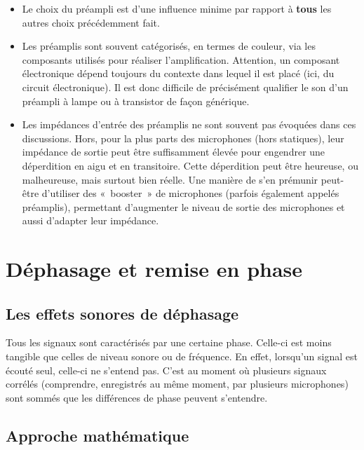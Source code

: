 \documentclass[
]{book}
\providecommand{\tightlist}{%
  \setlength{\itemsep}{0pt}\setlength{\parskip}{0pt}}
\begin{document}
\begin{itemize}
\tightlist
\item
  Le choix du préampli est d'une influence minime par rapport à \textbf{tous} les autres choix précédemment fait.
\item
  Les préamplis sont souvent catégorisés, en termes de couleur, via les composants utilisés pour réaliser l'amplification. Attention, un composant électronique dépend toujours du contexte dans lequel il est placé (ici, du circuit électronique). Il est donc difficile de précisément qualifier le son d'un préampli à lampe ou à transistor de façon générique.
\item
  Les impédances d'entrée des préamplis ne sont souvent pas évoquées dans ces discussions. Hors, pour la plus parts des microphones (hors statiques), leur impédance de sortie peut être suffisamment élevée pour engendrer une déperdition en aigu et en transitoire. Cette déperdition peut être heureuse, ou malheureuse, mais surtout bien réelle. Une manière de s'en prémunir peut-être d'utiliser des «~booster~» de microphones (parfois également appelés préamplis), permettant d'augmenter le niveau de sortie des microphones et aussi d'adapter leur impédance.
\end{itemize}

\hypertarget{duxe9phasage-et-remise-en-phase}{%
\chapter{Déphasage et remise en phase}\label{duxe9phasage-et-remise-en-phase}}

\hypertarget{les-effets-sonores-de-duxe9phasage}{%
\section{Les effets sonores de déphasage}\label{les-effets-sonores-de-duxe9phasage}}

Tous les signaux sont caractérisés par une certaine phase. Celle-ci est moins tangible que celles de niveau sonore ou de fréquence. En effet, lorsqu'un signal est écouté seul, celle-ci ne s'entend pas. C'est au moment où plusieurs signaux corrélés (comprendre, enregistrés au même moment, par plusieurs microphones) sont sommés que les différences de phase peuvent s'entendre.

\hypertarget{approche-mathuxe9matique}{%
\section{Approche mathématique}\label{approche-mathuxe9matique}}
\end{document}
